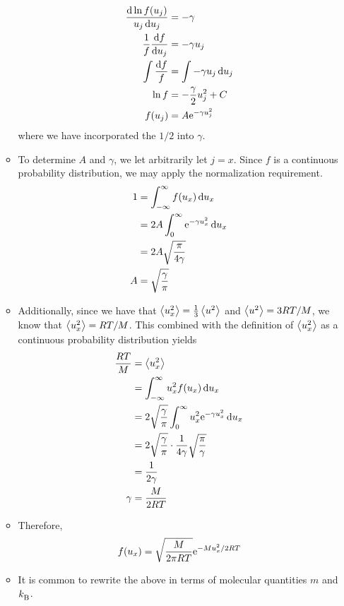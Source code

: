 \documentclass[../notes.tex]{subfiles}
\begin{document}
\begin{itemize}
\begin{itemize}
        \begin{align*}
            \frac{\dd{\ln f(u_j)}}{u_j\dd{u_j}} &= -\gamma\\
            \frac{1}{f}\dv{f}{u_j} &= -\gamma u_j\\
            \int\frac{\dd{f}}{f} &= \int-\gamma u_j\dd{u_j}\\
            \ln f &= -\frac{\gamma}{2}u_j^2+C\\
            f(u_j) &= A\e[-\gamma u_j^2]
        \end{align*}
        where we have incorporated the $1/2$ into $\gamma$.
        \item To determine $A$ and $\gamma$, we let arbitrarily let $j=x$. Since $f$ is a continuous probability distribution, we may apply the normalization requirement.
        \begin{align*}
            1 &= \int_{-\infty}^\infty f(u_x)\dd{u_x}\\
            &= 2A\int_0^\infty\e[-\gamma u_x^2]\dd{u_x}\\
            &= 2A\sqrt{\frac{\pi}{4\gamma}}\\
            A &= \sqrt{\frac{\gamma}{\pi}}
        \end{align*}
        \item Additionally, since we have that $\prb{u_x^2}=\frac{1}{3}\prb{u^2}$ and $\prb{u^2}=3RT/M$, we know that $\prb{u_x^2}=RT/M$. This combined with the definition of $\prb{u_x^2}$ as a continuous probability distribution yields
        \begin{align*}
            \frac{RT}{M} &= \prb{u_x^2}\\
            &= \int_{-\infty}^\infty u_x^2f(u_x)\dd{u_x}\\
            &= 2\sqrt{\frac{\gamma}{\pi}}\int_0^\infty u_x^2\e[-\gamma u_x^2]\dd{u_x}\\
            &= 2\sqrt{\frac{\gamma}{\pi}}\cdot\frac{1}{4\gamma}\sqrt{\frac{\pi}{\gamma}}\\
            &= \frac{1}{2\gamma}\\
            \gamma &= \frac{M}{2RT}
        \end{align*}
        \item Therefore,
        \begin{equation*}
            f(u_x) = \sqrt{\frac{M}{2\pi RT}}\e[-Mu_x^2/2RT]
        \end{equation*}
        \item It is common to rewrite the above in terms of molecular quantities $m$ and $\kB$.

\end{itemize}
\end{itemize}
\end{document}
